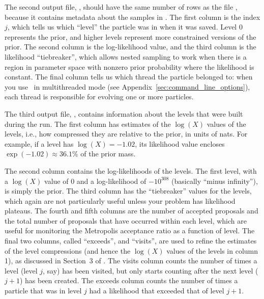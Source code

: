 \documentclass[article]{jss}
\newcommand{\dnest}{\pkg{DNest4}}
\begin{document}
The second output file, , should have the same number of
rows as the file , because it contains metadata about the samples in
. The first
column is the index $j$, which tells us which ``level'' the particle was in
when it was saved. Level 0 represents the prior, and higher levels represent
more constrained versions of the prior.
The second column is the log-likelihood value, and the third column is
the likelihood ``tiebreaker'', which allows nested sampling to work when
there is a region in parameter space with nonzero prior probability where the
likelihood is constant. The final column tells us which thread the particle
belonged to: when you use \dnest~in multithreaded mode
(see Appendix~\ref{sec:command_line_options}), each thread
is responsible for evolving one or more particles.

The third output file, , contains information about the levels
that were built during the run. The first column has estimates of the $\log(X)$
values of the levels, i.e., how compressed they are relative to the prior, in
units of nats. For example, if a level has $\log(X) = -1.02$, its likelihood
value encloses $\exp(-1.02) \approx 36.1\%$ of the prior mass.

The second column contains the log-likelihoods of the levels.
The first level, with a $\log(X)$ value of 0 and a log-likelihood of
$-10^{308}$ (basically ``minus infinity''), is simply the prior. The third
column has the ``tiebreaker'' values for the levels, which again are not
particularly useful unless your problem has likelihood plateaus. The fourth
and fifth columns are the number of accepted proposals and the total number
of proposals that have occurred within each level, which are useful for
monitoring the Metropolis acceptance ratio as a function of level.
The final two columns, called ``exceeds'', and ``visits'', are used to refine
the estimates of the level compressions (and hence the $\log(X)$ values of
the levels in column 1), as discussed in Section~3 of
\citet{brewer2011diffusive}.
The visits column counts the number of times a level (level $j$, say)
has been visited, but only starts counting after the next level ($j+1$) has been created. The exceeds column counts the number of times a particle that was
in level $j$ had a likelihood that exceeded that of level $j+1$.
\end{document}
